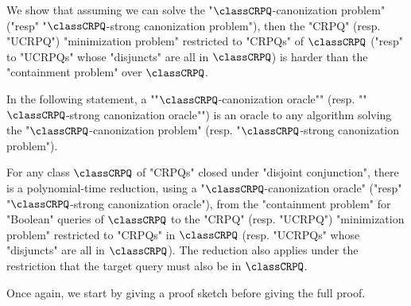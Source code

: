\bigskip
We show that assuming we can solve the "$\classCRPQ$-canonization problem" ("resp" "$\classCRPQ$-strong canonization problem"), then the "CRPQ" (resp. "UCRPQ") "minimization problem"
restricted to "CRPQs" of $\classCRPQ$ ("resp" to "UCRPQs" whose "disjuncts" are all in $\classCRPQ$) is harder than the "containment problem" over $\classCRPQ$.

In the following statement, a \AP""$\classCRPQ$-canonization oracle"" (resp. \AP""$\classCRPQ$-strong canonization oracle"") is an oracle to any algorithm solving the "$\classCRPQ$-canonization problem" (resp. "$\classCRPQ$-strong canonization problem").

\begin{lemma}
	\AP\label{lem:reduction-containment-to-minimization}
	For any class $\classCRPQ$ of "CRPQs" closed under "disjoint conjunction",
	there is a polynomial-time reduction,
	using a "$\classCRPQ$-canonization oracle" ("resp" "$\classCRPQ$-strong canonization oracle"),
	from the "containment problem" for "Boolean" queries of $\classCRPQ$ to the
	"CRPQ" (resp. "UCRPQ") "minimization problem" restricted to "CRPQs" in $\classCRPQ$
	(resp. "UCRPQs" whose "disjuncts" are all in $\classCRPQ$).
	The reduction also applies under the restriction that the target query must also be in
	$\classCRPQ$.
\end{lemma}

Once again, we start by giving a proof sketch before giving the full proof.

